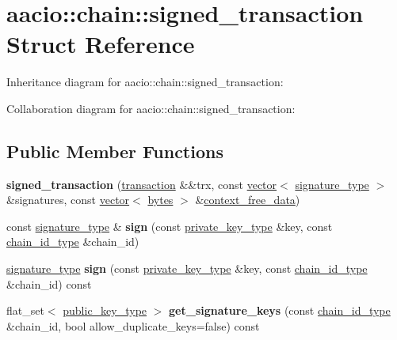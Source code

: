 \hypertarget{structaacio_1_1chain_1_1signed__transaction}{}\section{aacio\+:\+:chain\+:\+:signed\+\_\+transaction Struct Reference}
\label{structaacio_1_1chain_1_1signed__transaction}


Inheritance diagram for aacio\+:\+:chain\+:\+:signed\+\_\+transaction\+:


Collaboration diagram for aacio\+:\+:chain\+:\+:signed\+\_\+transaction\+:
\subsection*{Public Member Functions}
\begin{DoxyCompactItemize}
\item 
\mbox{\label{structaacio_1_1chain_1_1signed__transaction_a0ea1fb2937069bc7f6c2fa3e3582a717}} 
{\bfseries signed\+\_\+transaction} (\mbox{\hyperlink{structaacio_1_1chain_1_1transaction}{transaction}} \&\&trx, const \mbox{\hyperlink{classstd_1_1vector}{vector}}$<$ \mbox{\hyperlink{classfc_1_1crypto_1_1signature}{signature\+\_\+type}} $>$ \&signatures, const \mbox{\hyperlink{classstd_1_1vector}{vector}}$<$ \mbox{\hyperlink{classstd_1_1vector}{bytes}} $>$ \&\mbox{\hyperlink{structaacio_1_1chain_1_1signed__transaction_adc8566b0377013a718f0e250b62d0adc}{context\+\_\+free\+\_\+data}})
\item 
\mbox{\label{structaacio_1_1chain_1_1signed__transaction_a8ec08f8818952e7e0f8befb09d58f270}} 
const \mbox{\hyperlink{classfc_1_1crypto_1_1signature}{signature\+\_\+type}} \& {\bfseries sign} (const \mbox{\hyperlink{classfc_1_1crypto_1_1private__key}{private\+\_\+key\+\_\+type}} \&key, const \mbox{\hyperlink{classfc_1_1sha256}{chain\+\_\+id\+\_\+type}} \&chain\+\_\+id)
\item 
\mbox{\label{structaacio_1_1chain_1_1signed__transaction_adc891eb07638ec08f669d1a9378e9c49}} 
\mbox{\hyperlink{classfc_1_1crypto_1_1signature}{signature\+\_\+type}} {\bfseries sign} (const \mbox{\hyperlink{classfc_1_1crypto_1_1private__key}{private\+\_\+key\+\_\+type}} \&key, const \mbox{\hyperlink{classfc_1_1sha256}{chain\+\_\+id\+\_\+type}} \&chain\+\_\+id) const
\item 
\mbox{\label{structaacio_1_1chain_1_1signed__transaction_ad70a956427e336d0a1c00660c1e9b738}} 
flat\+\_\+set$<$ \mbox{\hyperlink{classfc_1_1crypto_1_1public__key}{public\+\_\+key\+\_\+type}} $>$ {\bfseries get\+\_\+signature\+\_\+keys} (const \mbox{\hyperlink{classfc_1_1sha256}{chain\+\_\+id\+\_\+type}} \&chain\+\_\+id, bool allow\+\_\+duplicate\+\_\+keys=false) const
\end{DoxyCompactItemize}
